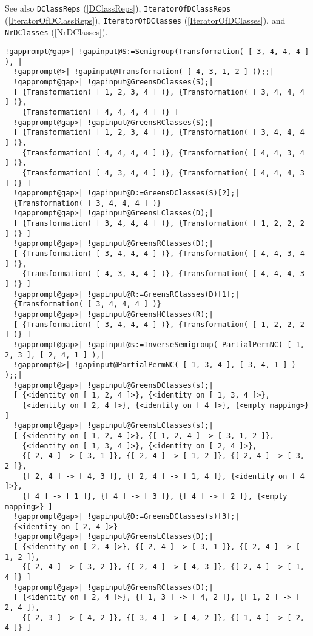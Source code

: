 \documentclass[a4paper,11pt]{report}
\begin{document}
{{{ See also \texttt{DClassReps} (\ref{DClassReps}), \texttt{IteratorOfDClassReps} (\ref{IteratorOfDClassReps}), \texttt{IteratorOfDClasses} (\ref{IteratorOfDClasses}), and \texttt{NrDClasses} (\ref{NrDClasses}). 
\begin{Verbatim}[commandchars=!@|,fontsize=\small,frame=single,label=Example]
  !gapprompt@gap>| !gapinput@S:=Semigroup(Transformation( [ 3, 4, 4, 4 ] ), |
  !gapprompt@>| !gapinput@Transformation( [ 4, 3, 1, 2 ] ));;|
  !gapprompt@gap>| !gapinput@GreensDClasses(S);|
  [ {Transformation( [ 1, 2, 3, 4 ] )}, {Transformation( [ 3, 4, 4, 4 ] )}, 
    {Transformation( [ 4, 4, 4, 4 ] )} ]
  !gapprompt@gap>| !gapinput@GreensRClasses(S);|
  [ {Transformation( [ 1, 2, 3, 4 ] )}, {Transformation( [ 3, 4, 4, 4 ] )}, 
    {Transformation( [ 4, 4, 4, 4 ] )}, {Transformation( [ 4, 4, 3, 4 ] )}, 
    {Transformation( [ 4, 3, 4, 4 ] )}, {Transformation( [ 4, 4, 4, 3 ] )} ]
  !gapprompt@gap>| !gapinput@D:=GreensDClasses(S)[2];|
  {Transformation( [ 3, 4, 4, 4 ] )}
  !gapprompt@gap>| !gapinput@GreensLClasses(D);|
  [ {Transformation( [ 3, 4, 4, 4 ] )}, {Transformation( [ 1, 2, 2, 2 ] )} ]
  !gapprompt@gap>| !gapinput@GreensRClasses(D);|
  [ {Transformation( [ 3, 4, 4, 4 ] )}, {Transformation( [ 4, 4, 3, 4 ] )}, 
    {Transformation( [ 4, 3, 4, 4 ] )}, {Transformation( [ 4, 4, 4, 3 ] )} ]
  !gapprompt@gap>| !gapinput@R:=GreensRClasses(D)[1];|
  {Transformation( [ 3, 4, 4, 4 ] )}
  !gapprompt@gap>| !gapinput@GreensHClasses(R);|
  [ {Transformation( [ 3, 4, 4, 4 ] )}, {Transformation( [ 1, 2, 2, 2 ] )} ]
  !gapprompt@gap>| !gapinput@s:=InverseSemigroup( PartialPermNC( [ 1, 2, 3 ], [ 2, 4, 1 ] ),|
  !gapprompt@>| !gapinput@PartialPermNC( [ 1, 3, 4 ], [ 3, 4, 1 ] ) );;|
  !gapprompt@gap>| !gapinput@GreensDClasses(s);|
  [ {<identity on [ 1, 2, 4 ]>}, {<identity on [ 1, 3, 4 ]>},
    {<identity on [ 2, 4 ]>}, {<identity on [ 4 ]>}, {<empty mapping>} ]
  !gapprompt@gap>| !gapinput@GreensLClasses(s);|
  [ {<identity on [ 1, 2, 4 ]>}, {[ 1, 2, 4 ] -> [ 3, 1, 2 ]},
    {<identity on [ 1, 3, 4 ]>}, {<identity on [ 2, 4 ]>},
    {[ 2, 4 ] -> [ 3, 1 ]}, {[ 2, 4 ] -> [ 1, 2 ]}, {[ 2, 4 ] -> [ 3, 2 ]},
    {[ 2, 4 ] -> [ 4, 3 ]}, {[ 2, 4 ] -> [ 1, 4 ]}, {<identity on [ 4 ]>},
    {[ 4 ] -> [ 1 ]}, {[ 4 ] -> [ 3 ]}, {[ 4 ] -> [ 2 ]}, {<empty mapping>} ]
  !gapprompt@gap>| !gapinput@D:=GreensDClasses(s)[3];|
  {<identity on [ 2, 4 ]>}
  !gapprompt@gap>| !gapinput@GreensLClasses(D);|
  [ {<identity on [ 2, 4 ]>}, {[ 2, 4 ] -> [ 3, 1 ]}, {[ 2, 4 ] -> [ 1, 2 ]},
    {[ 2, 4 ] -> [ 3, 2 ]}, {[ 2, 4 ] -> [ 4, 3 ]}, {[ 2, 4 ] -> [ 1, 4 ]} ]
  !gapprompt@gap>| !gapinput@GreensRClasses(D);|
  [ {<identity on [ 2, 4 ]>}, {[ 1, 3 ] -> [ 4, 2 ]}, {[ 1, 2 ] -> [ 2, 4 ]},
    {[ 2, 3 ] -> [ 4, 2 ]}, {[ 3, 4 ] -> [ 4, 2 ]}, {[ 1, 4 ] -> [ 2, 4 ]} ]
\end{Verbatim}
 }

}}
\end{document}
